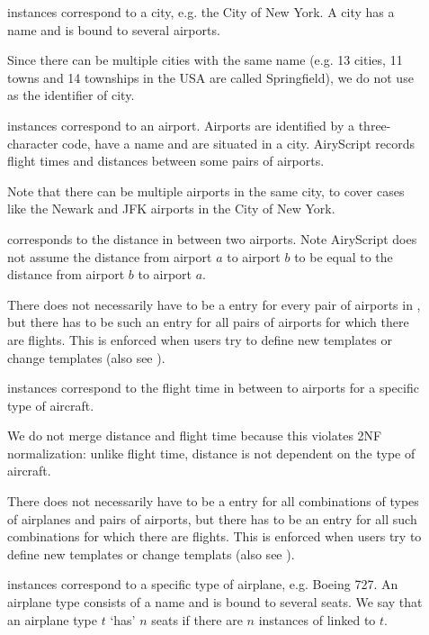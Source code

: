 \begin{description}
  \item[] instances correspond to a city, e.g. the City of New York. A
    city has a name and is bound to several airports.

    Since there can be multiple cities with the same name (e.g. 13 cities, 11
    towns and 14 townships in the USA are called Springfield), we do not use
     as the identifier of city.

  \item[] instances correspond to an airport. Airports are identified by a
    three-character code, have a name and are situated in a city. AiryScript
    records flight times and distances between some pairs of airports. 
    
    Note that there can be multiple airports in the same city, to cover cases
    like the Newark and JFK airports in the City of New York.

  \item[] corresponds to the distance in between two airports.
    Note AiryScript does not assume the distance from airport $a$ to airport $b$
    to be equal to the distance from airport $b$ to airport $a$.

    There does not necessarily have to be a  entry for every pair
    of airports in , but there has to be such an entry for all
    pairs of airports for which there are flights. This is enforced when users
    try to define new templates or change templates (also see ).

  \item[] instances correspond to the flight time in between to airports
    for a specific type of aircraft.
    
    We do not merge distance and flight time because this violates 2NF
    normalization: unlike flight time, distance is not dependent on the type of
    aircraft.

    There does not necessarily have to be a  entry for all
    combinations of types of airplanes and pairs of airports, but there has to
    be an entry for all such combinations for which there are flights. This is
    enforced when users try to define new templates or change templats (also see
    ).

  \item[] instances correspond to a specific type of airplane, e.g.
    Boeing 727. An airplane type consists of a name and is bound to several
    seats. We say that an airplane type $t$ ‘has’ $n$ seats if there are $n$
    instances of  linked to $t$.


\end{description}
